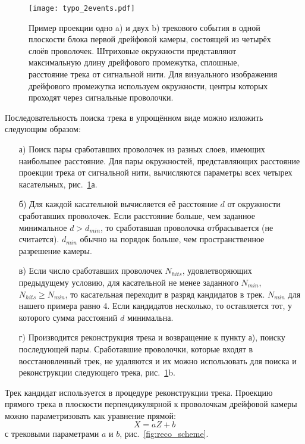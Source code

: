 \begin{figure}[h]
  \begin{center}
    \texttt{[image: typo\_2events.pdf]}
    \caption {Пример проекции одно a) и двух b) трекового события в одной
      плоскости блока первой дрейфовой камеры, состоящей из четырёх слоёв
      проволочек. Штриховые окружности представляют максимальную длину
      дрейфового промежутка, сплошные, расстояние трека от сигнальной нити.
      Для визуального изображения дрейфового промежутка используем окружности,
      центры которых проходят через сигнальные проволочки.}
    \label{fig:typo_event}
  \end{center}
\end{figure}

Последовательность поиска трека в упрощённом виде можно изложить следующим
образом:
\begin{itemize}
\item[а)]Поиск пары сработавших проволочек из разных слоев, имеющих наибольшее
  расстояние. Для пары окружностей, представляющих расстояние проекции трека
  от сигнальной нити, вычисляются параметры всех четырех касательных,
  рис.~\ref{fig:typo_event}а.
\item[б)]Для каждой касательной вычисляется её расстояние $d$ от окружности
  сработавших проволочек. Если расстояние больше, чем заданное минимальное
  $d > d_{min}$, то сработавшая проволочка отбрасывается (не считается).
  $d_{min}$ обычно на порядок больше, чем пространственное разрешение камеры.
\item[в)]Если число сработавших проволочек $N_{hits}$, удовлетворяющих
  предыдущему условию, для касательной не менее заданного $N_{min}$,
  $N_{hits} \geq N_{min}$, то касательная переходит в разряд кандидатов в трек.
  $N_{min}$ для нашего примера равно 4. Если кандидатов несколько, то
  оставляется тот, у которого сумма расстояний $d$ минимальна.
\item[г)] Производится реконструкция трека и возвращение к пункту а), поиску
  последующей пары. Сработавшие проволочки, которые входят в восстановленный
  трек, не удаляются и их можно использовать для поиска и реконструкции
  следующего трека, рис.~\ref{fig:typo_event}b.
\end{itemize}

Трек кандидат используется в процедуре реконструкции трека. Проекцию прямого
трека в плоскости перпендикулярной к проволочкам дрейфовой камеры можно
параметризовать как уравнение прямой:
\[
X = aZ + b
\]
с трековыми параметрами $a$ и $b$, рис.~\ref{fig:reco_scheme}.

